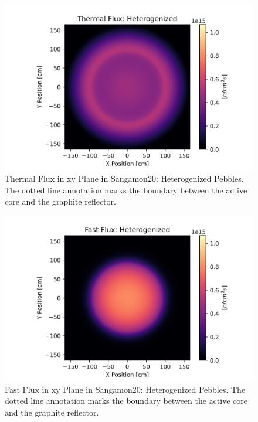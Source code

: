 \begin{figure}[H]
\centering

\includegraphics[width=1.0\linewidth]{figures/therm_xy_plane_het_v2.png}
\caption{Thermal Flux in xy Plane in Sangamon20: Heterogenized Pebbles.  The dotted line annotation marks the boundary between the active core and the graphite reflector.}
\label{fig:het-plane-therm}

\end{figure}

\begin{figure}[H]
\centering

\includegraphics[width=1.0\linewidth]{figures/fast_xy_plane_het_v2.png}
\caption{Fast Flux in xy Plane in Sangamon20: Heterogenized Pebbles.  The dotted line annotation marks the boundary between the active core and the graphite reflector.}
\label{fig:het-plane-fast}

\end{figure}